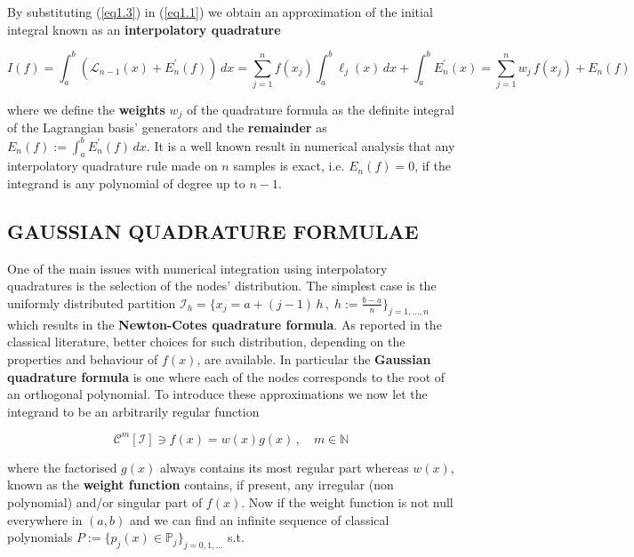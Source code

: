 \documentclass[a4paper, twosided]{book}
\begin{document}
\color{black}

\noindent
By substituting (\ref{eq1.3}) in (\ref{eq1.1}) we obtain an approximation of the initial integral known as an \color{poliDarkBlue} \textbf{interpolatory quadrature} \color{black}

\begin{equation}\label{eq1.4}
    I(f) = \int_a^b (\mathcal{L}_{n-1}(x) + E^{'}_n(f))\,dx = \sum_{j=1}^{n}f(x_j)\int_a^b \ell_j(x)\,dx + \int_a^b E^{'}_n(x) = \sum_{j=1}^{n}w_j\,f(x_j) + E_n(f)
\end{equation}

\noindent
where we define the \color{poliDarkBlue} \textbf{weights} \color{black} $w_j$ of the quadrature formula as the definite integral of the Lagrangian basis' generators and the \color{poliDarkBlue} \textbf{remainder} \color{black} as $E_n(f):=\int_a^b E^{'}_n(f)\,dx$. It is a well known result in numerical analysis that any interpolatory quadrature rule made on $n$ samples is exact, i.e. $E_n(f)=0$, if the integrand is any polynomial of degree up to $n-1$.

\subsection[Gaussian quadrature formulae]{\changefont GAUSSIAN QUADRATURE FORMULAE}\label{SubSec1.2.2}

One of the main issues with numerical integration using interpolatory quadratures is the selection of the nodes' distribution. The simplest case is the uniformly distributed partition 
$\mathcal{I}_h =\big\{x_j = a + (j-1)\,h\,,\;h:=\frac{b-a}{n}\big\}_{j=1,...,n}$ which results in the \color{poliDarkBlue} \textbf{Newton-Cotes quadrature formula}\color{black}. As reported in the classical literature, better choices for such distribution, depending on the properties and behaviour of $f(x)$, are available. In particular the \color{poliDarkBlue} \textbf{Gaussian quadrature formula} \color{black} is one where each of the nodes corresponds to the root of an orthogonal polynomial. To introduce these approximations we now let the integrand to be an arbitrarily regular function

\begin{equation}\label{eq1.5}
    \mathcal{C}^m[\mathcal{I}]\ni f(x) = w(x)g(x)\,,\quad m\in\mathbb{N}
\end{equation}

\noindent
where the factorised $g(x)$ always contains its most regular part whereas $w(x)$, known as the \color{poliDarkBlue} \textbf{weight function} \color{black} contains, if present, any irregular (non polynomial) and/or singular part of $f(x)$. Now if the weight function is not null everywhere in $(a,b)$ and we can find an infinite sequence of classical polynomials $P:=\big\{p_j(x)\in\mathbb{P}_j\big\}_{j=0,1,...}$ s.t.
\end{document}
